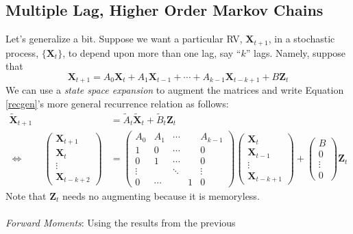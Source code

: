 \documentclass[a4paper,12pt]{scrartcl}
\begin{document}
\newpage
\subsection{Multiple Lag, Higher Order Markov Chains}

Let's generalize a bit.  Suppose we want a particular RV,
$\mathbf{X}_{t+1}$, in a stochastic process, $\{\mathbf{X}_t\}$, to
depend upon more than one lag, say ``$k$'' lags. Namely, suppose that
\begin{equation}
    \label{recgen}
    \mathbf{X}_{t+1} = A_0 \mathbf{X}_t + A_1 \mathbf{X}_{t-1}
    + \cdots + A_{k-1}\mathbf{X}_{t-k+1} + B \mathbf{Z}_t
\end{equation}
We can use a \emph{state space expansion} to augment the matrices 
and write Equation \ref{recgen}'s more general recurrence relation 
as follows:
\begin{align*}
    \tilde{\mathbf{X}}_{t+1} &= \tilde{A}_t
	\tilde{\mathbf{X}}_t + \tilde{B}_t \mathbf{Z}_t \\
    \Leftrightarrow \qquad
    \begin{pmatrix} \mathbf{X}_{t+1} \\
	\mathbf{X}_{t} \\ \vdots \\ \mathbf{X}_{t-k+2} \end{pmatrix}
	&= 
	\begin{pmatrix} A_0 & A_1 & \cdots & & A_{k-1} \\
			1 & 0 & \cdots & & 0 \\
			0 & 1 & \cdots & & 0 \\
			\vdots & & \ddots & & \vdots \\
			0 & \cdots & & 1 & 0 
	\end{pmatrix} 
	\begin{pmatrix} \mathbf{X}_{t} \\
	\mathbf{X}_{t-1} \\ \vdots \\ \mathbf{X}_{t-k+1} \end{pmatrix}
	+ \begin{pmatrix} B \\ 0 \\ \vdots \\ 0 \end{pmatrix}
	\mathbf{Z}_t
\end{align*}
Note that $\mathbf{Z}_t$ needs no augmenting because it is memoryless.
\\
\\
{\sl Forward Moments}: Using the results from the previous 
\end{document}
